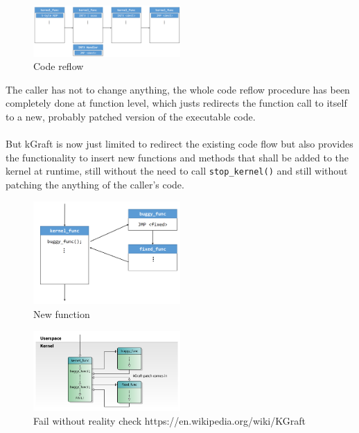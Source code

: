 \documentclass{sig-alternate-05-2015}
\begin{document}
\begin{figure}[ht!]
	\includegraphics[width=0.5\textwidth]{img/kgraft_code_reflow.png}
	\caption{Code reflow \cite{kgfraft-1}}
	\label{fig:kgraft-code-reflow}
\end{figure}

The caller has not to change anything, the whole code reflow procedure has been completely done at function level, which justs redirects the function call to itself to a new, probably patched version of the executable code. \\ 
\\
But kGraft is now just limited to redirect the existing code flow but also provides the functionality to insert new functions and methods that shall be added to the kernel at runtime, still without the need to call \texttt{stop\_kernel()} and still without patching the anything of the caller's code.

\begin{figure}[ht!]
	\includegraphics[width=0.5\textwidth]{img/kgraft_new_func.png}
	\caption{New function \cite{kgfraft-1}}
	\label{fig:kgraft-new-func}
\end{figure}


\begin{figure}[ht!]
	\includegraphics[width=0.5\textwidth]{img/kgraft-live-patching-realty-check-1.png}
	\caption{Fail without reality check https://en.wikipedia.org/wiki/KGraft}
	\label{fig:kgraft-real-check-fail}
\end{figure}
\end{document}
